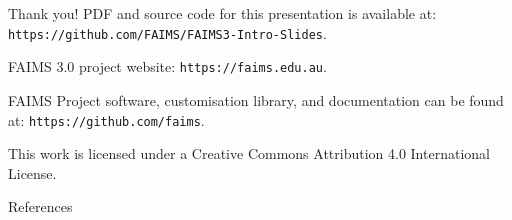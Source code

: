 \documentclass[
	aspectratio=169, %
	12pt, %
	t, %
]{beamer}
\begin{document}
\begin{refsegment}
\begin{frame}
\begin{itemize}
    \end{itemize}



\end{frame} 


\begin{frame}{Thank you!}
PDF and source code for this presentation is available at: 
\texttt{https://github.com/FAIMS/FAIMS3-Intro-Slides}.

FAIMS 3.0 project website: \texttt{https://faims.edu.au}.

FAIMS Project software, customisation library, and documentation can be found at:
\texttt{https://github.com/faims}.


This work is licensed under a Creative Commons Attribution 4.0 International License.

\end{frame}






\begin{frame}[allowframebreaks]{References}

\printbibliography[heading=none, segment=1]
\end{frame}


\end{refsegment}



\end{document}
